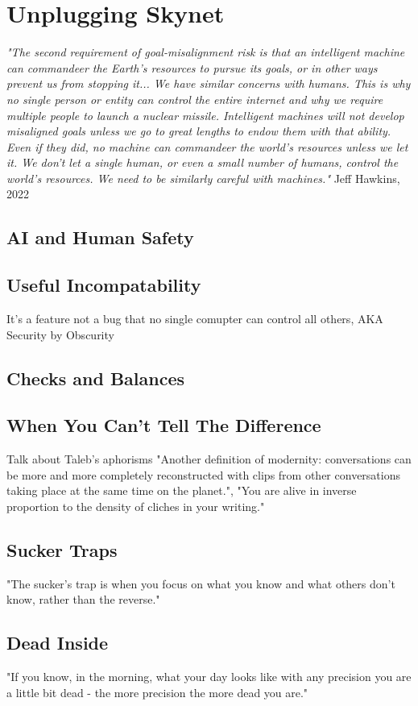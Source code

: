 \setchapterpreamble[u]{\margintoc}
\chapter{Unplugging Skynet}

\textit{"The second requirement of goal-misalignment risk is that an intelligent machine can commandeer the Earth's resources to pursue its goals, or in other ways prevent us from stopping it... We have similar concerns with humans. This is why no single person or entity can control the entire internet and why we require multiple people to launch a nuclear missile. Intelligent machines will not develop misaligned goals unless we go to great lengths to endow them with that ability. Even if they did, no machine can commandeer the world's resources unless we let it. We don't let a single human, or even a small number of humans, control the world's resources. We need to be similarly careful with machines."} Jeff Hawkins, 2022 \cite{hawkins_2022}

\section{AI and Human Safety}

\section{Useful Incompatability}

It's a feature not a bug that no single comupter can control all others, AKA Security by Obscurity

\section{Checks and Balances}

\section{When You Can't Tell The Difference}

Talk about Taleb's aphorisms "Another definition of modernity: conversations can be more and more completely reconstructed with clips from other conversations taking place at the same time on the planet.", "You are alive in inverse proportion to the density of cliches in your writing." 

\section{Sucker Traps}

"The sucker's trap is when you focus on what you know and what others don't know, rather than the reverse."

\section{Dead Inside}

"If you know, in the morning, what your day looks like with any precision you are a little bit dead - the more precision the more dead you are."
